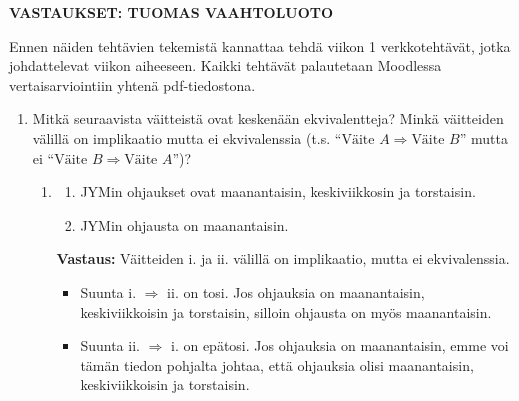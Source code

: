 \documentclass[a4paper,12pt]{article}
\begin{document}
 

\otsikko
\textbf{VASTAUKSET: TUOMAS VAAHTOLUOTO} \vspace{1em}

Ennen n\"aiden teht\"avien tekemist\"a kannattaa tehd\"a viikon 1 verkkoteht\"av\"at, jotka johdattelevat viikon aiheeseen.
Kaikki teht\"av\"at palautetaan Moodlessa vertaisarviointiin yhten\"a pdf-tiedostona. 

\begin{enumerate}

\item Mitk\"a seuraavista v\"aitteist\"a ovat kesken\"a\"an ekvivalentteja? Mink\"a v\"aitteiden v\"alill\"a on implikaatio mutta ei ekvivalenssia (t.s. ``$\textrm{V\"aite }A \Rightarrow \textrm{V\"aite }B$'' mutta ei ``$\textrm{V\"aite }B \Rightarrow \textrm{V\"aite }A$'')?

\begin{enumerate}
\item
\begin{enumerate}
\item JYMin ohjaukset ovat maanantaisin, keskiviikkosin ja torstaisin.
\item JYMin ohjausta on maanantaisin.\vspace{0.5cm}
\end{enumerate}

\textbf{Vastaus:} Väitteiden i. ja ii. välillä on implikaatio, mutta ei ekvivalenssia. 
\begin{itemize}
    \item Suunta i. $\Rightarrow$ ii. on tosi. Jos ohjauksia on maanantaisin, keskiviikkoisin ja torstaisin, silloin ohjausta on myös maanantaisin.
    \item Suunta ii. $\Rightarrow$ i. on epätosi. Jos ohjauksia on maanantaisin, emme voi tämän tiedon pohjalta johtaa, että ohjauksia olisi maanantaisin, keskiviikkoisin ja torstaisin. \vspace{0.5cm}
\end{itemize}


\end{enumerate}
\end{enumerate}
\end{document}
